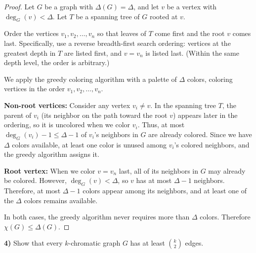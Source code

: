 \documentclass[12pt]{article}
\begin{document}
\begin{proof}
Let $G$ be a graph with $\Delta(G) = \Delta$, and let $v$ be a vertex with $\deg_G(v) < \Delta$. Let $T$ be a spanning tree of $G$ rooted at $v$.

Order the vertices $v_1, v_2, \ldots, v_n$ so that leaves of $T$ come first and the root $v$ comes last. Specifically, use a reverse breadth-first search ordering: vertices at the greatest depth in $T$ are listed first, and $v = v_n$ is listed last. (Within the same depth level, the order is arbitrary.)

We apply the greedy coloring algorithm with a palette of $\Delta$ colors, coloring vertices in the order $v_1, v_2, \ldots, v_n$.

\textbf{Non-root vertices:} Consider any vertex $v_i \neq v$. In the spanning tree $T$, the parent of $v_i$ (its neighbor on the path toward the root $v$) appears later in the ordering, so it is uncolored when we color $v_i$. Thus, at most $\deg_G(v_i) - 1 \leq \Delta - 1$ of $v_i$'s neighbors in $G$ are already colored. Since we have $\Delta$ colors available, at least one color is unused among $v_i$'s colored neighbors, and the greedy algorithm assigns it.

\textbf{Root vertex:} When we color $v = v_n$ last, all of its neighbors in $G$ may already be colored. However, $\deg_G(v) < \Delta$, so $v$ has at most $\Delta - 1$ neighbors. Therefore, at most $\Delta - 1$ colors appear among its neighbors, and at least one of the $\Delta$ colors remains available.

In both cases, the greedy algorithm never requires more than $\Delta$ colors. Therefore $\chi(G) \leq \Delta(G)$.
\end{proof}

\textbf{4)} Show that every $k$-chromatic graph $G$ has at least $\binom{k}{2}$ edges.
\end{document}
